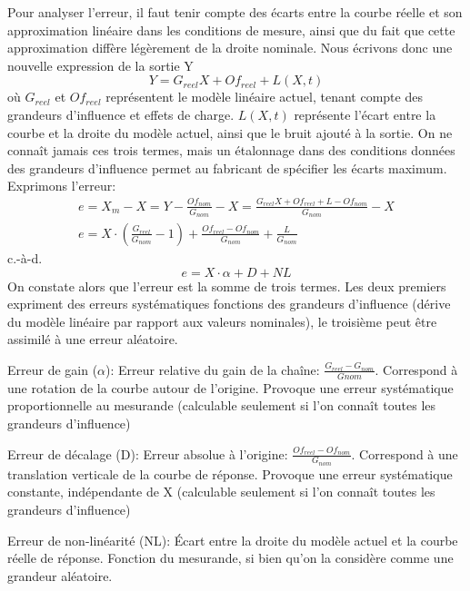 \documentclass[main.tex]{subfiles}
\begin{document}
Pour analyser l'erreur, il faut tenir compte des écarts entre la courbe réelle et son approximation linéaire dans les conditions de mesure, ainsi que du fait que cette approximation diffère légèrement de la droite nominale. Nous écrivons donc une nouvelle expression de la sortie Y
\begin{equation}
    Y = G_{reel}X + Of_{reel} + L(X,t)
\end{equation}
où $G_{reel}$ et $Of_{reel}$ représentent le modèle linéaire actuel, tenant compte des grandeurs d'influence et effets de charge. $L(X,t)$ représente l'écart entre la courbe et la droite du modèle actuel, ainsi que le bruit ajouté à la sortie. On ne connaît jamais ces trois termes, mais un étalonnage dans des conditions données des grandeurs d'influence permet au fabricant de spécifier les écarts maximum. Exprimons l'erreur:
\begin{gather}
    e = X_m - X =  Y - \frac{Of_{nom}}{G_{nom}} - X = \frac{G_{reel}X + Of_{reel} + L -Of_{nom}}{G_{nom}} - X\\
    e = X \cdot(\frac{G_{reel}}{G_{nom}}   - 1) +  \frac{Of_{reel} - Of_{nom}}{G_{nom}}   +  \frac{L}{G_{nom}}
\end{gather}
c.-à-d.
\begin{equation}
    e = X \cdot \alpha  + D + NL
\end{equation}
On constate alors que l'erreur est la somme de trois termes. Les deux premiers expriment des erreurs systématiques fonctions des grandeurs d'influence (dérive du modèle linéaire par rapport aux valeurs nominales), le troisième peut être assimilé à une erreur aléatoire.
\begin{definition}
	Erreur de gain  ($\alpha$): Erreur relative du gain de la chaîne: $\frac{G_{reel} - G_{nom}}{Gnom}$. Correspond à une rotation de la courbe autour de l'origine. Provoque une erreur systématique proportionnelle au mesurande (calculable seulement si l'on connaît toutes les grandeurs d'influence)
\end{definition}

\begin{definition}
	Erreur de décalage (D): Erreur absolue à l'origine: $\frac{Of_{reel} - Of_{nom}}{G_{nom}}$. Correspond à une translation verticale de la courbe de réponse. Provoque une erreur systématique constante, indépendante de X (calculable seulement si l'on connaît toutes les grandeurs d'influence)
\end{definition}

\begin{definition}
	Erreur de non-linéarité (NL): Écart entre la droite du modèle actuel et la courbe réelle de réponse. Fonction du mesurande, si bien qu'on la considère comme une grandeur aléatoire.
\end{definition}
\end{document}
